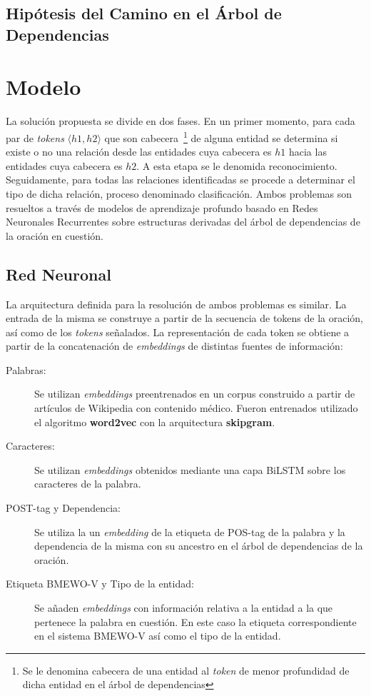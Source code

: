 \subsection{Hipótesis del Camino en el Árbol de Dependencias}


\section{Modelo}\label{sec:model}

La solución propuesta se divide en dos fases.
En un primer momento, para cada par de \textit{tokens} $\langle h1, h2\rangle$ que son cabecera~\footnote{Se le denomina cabecera de una entidad al \textit{token} de menor profundidad de dicha entidad en el árbol de dependencias} de alguna entidad se determina si existe o no una relación desde las entidades cuya cabecera es $h1$  hacia las entidades cuya cabecera es $h2$.
A esta etapa se le denomida reconocimiento.
Seguidamente, para todas las relaciones identificadas se procede a determinar el tipo de dicha relación, proceso denominado clasificación.
Ambos problemas son resueltos a través de modelos de aprendizaje profundo basado en Redes Neuronales Recurrentes sobre estructuras derivadas del árbol de dependencias de la oración en cuestión.

\subsection{Red Neuronal}

La arquitectura definida para la resolución de ambos problemas es similar. 
La entrada de la misma se construye a partir de la secuencia de tokens de la oración, así como de los \textit{tokens} señalados.
La representación de cada token se obtiene a partir de la concatenación de \textit{embeddings} de distintas fuentes de información:

\begin{description}
	\item[Palabras:] Se utilizan \textit{embeddings} preentrenados en un corpus construido a partir de artículos de Wikipedia con contenido médico.
	Fueron entrenados utilizado el algoritmo \textbf{word2vec}\cite{word2vec} con la arquitectura \textbf{skipgram}.
	
	\item[Caracteres:] Se utilizan \textit{embeddings} obtenidos mediante una capa BiLSTM sobre los caracteres de la palabra.
	
	\item[POST-tag y Dependencia:] Se utiliza la un \textit{embedding} de la etiqueta de POS-tag de la palabra y la dependencia de la misma con su ancestro en el árbol de dependencias de la oración.
	
	\item[Etiqueta BMEWO-V y Tipo de la entidad:] Se añaden \textit{embeddings} con información relativa a la entidad a la que pertenece la palabra en cuestión.
	En este caso la etiqueta correspondiente en el sistema BMEWO-V así como el tipo de la entidad.
	
\end{description}


